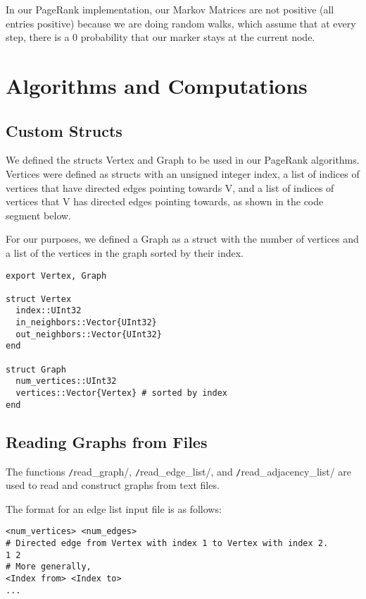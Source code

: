 \documentclass[12pt, titlepage, twoside]{amsart}
\theoremstyle{remark}
\begin{document}
In our PageRank implementation, our Markov Matrices are not positive (all entries positive) because we are doing random walks, which assume that at every step, there is a 0 probability that our marker stays at the current node.


\clearpage

\section{Algorithms and Computations}

\subsection{Custom Structs}

We defined the structs Vertex and Graph to be used in our PageRank algorithms. 
Vertices were defined as structs with an unsigned integer index, a list of indices of vertices that have directed edges pointing towards V, 
and a list of indices of vertices that V has directed edges pointing towards, 
as shown in the code segment below. 

For our purposes, we defined a Graph as a struct with the number of vertices and a list of the vertices in the graph sorted by their index.

\begin{verbatim}
export Vertex, Graph

struct Vertex
  index::UInt32
  in_neighbors::Vector{UInt32}
  out_neighbors::Vector{UInt32}
end

struct Graph
  num_vertices::UInt32
  vertices::Vector{Vertex} # sorted by index
end
\end{verbatim}

\subsection{Reading Graphs from Files}

The functions \texttt/read_graph/, \texttt/read_edge_list/, and \texttt/read_adjacency_list/ are used to read and construct graphs from text files.

The format for an edge list input file is as follows:

\begin{lstlisting}[basicstyle=\small]
<num_vertices> <num_edges>
# Directed edge from Vertex with index 1 to Vertex with index 2.
1 2
# More generally,
<Index from> <Index to>
...
\end{lstlisting}
\end{document}
